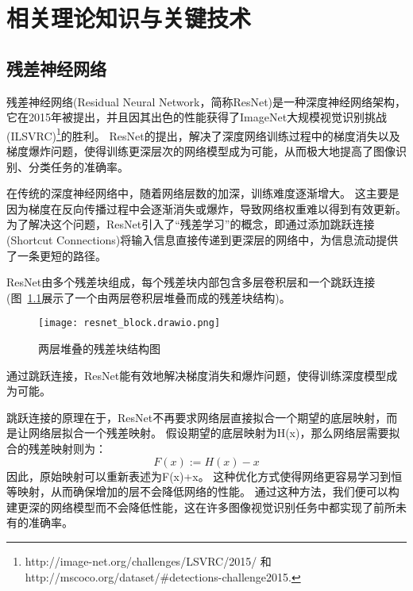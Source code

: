 \chapter{相关理论知识与关键技术}
\label{cha:basic-knowledge}

\section{残差神经网络}
残差神经网络(Residual Neural Network，简称ResNet)是一种深度神经网络架构，它在2015年被提出，并且因其出色的性能获得了ImageNet大规模视觉识别挑战(ILSVRC)\footnote{http://image-net.org/challenges/LSVRC/2015/ 和 http://mscoco.org/dataset/\#detections-challenge2015.}的胜利\cite{he2016deep}。
ResNet的提出，解决了深度网络训练过程中的梯度消失以及梯度爆炸问题，使得训练更深层次的网络模型成为可能，从而极大地提高了图像识别、分类任务的准确率。

在传统的深度神经网络中，随着网络层数的加深，训练难度逐渐增大。
这主要是因为梯度在反向传播过程中会逐渐消失或爆炸，导致网络权重难以得到有效更新。
为了解决这个问题，ResNet引入了“残差学习”的概念，即通过添加跳跃连接(Shortcut Connections)将输入信息直接传递到更深层的网络中，为信息流动提供了一条更短的路径。

ResNet由多个残差块组成，每个残差块内部包含多层卷积层和一个跳跃连接(图~\ref{fig:resnet_structure}展示了一个由两层卷积层堆叠而成的残差块结构)。
\begin{figure}[h]
  \centering
  \texttt{[image: resnet\_block.drawio.png]}
  \caption{两层堆叠的残差块结构图}
  \label{fig:resnet_structure}
\end{figure}
通过跳跃连接，ResNet能有效地解决梯度消失和爆炸问题，使得训练深度模型成为可能。


跳跃连接的原理在于，ResNet不再要求网络层直接拟合一个期望的底层映射，而是让网络层拟合一个残差映射。
假设期望的底层映射为H(x)，那么网络层需要拟合的残差映射则为：
\begin{equation}
  \label{eq:residual_mapping}
  F(x) := H(x) - x
\end{equation}
因此，原始映射可以重新表述为F(x)+x。
这种优化方式使得网络更容易学习到恒等映射，从而确保增加的层不会降低网络的性能。
通过这种方法，我们便可以构建更深的网络模型而不会降低性能，这在许多图像视觉识别任务中都实现了前所未有的准确率。


